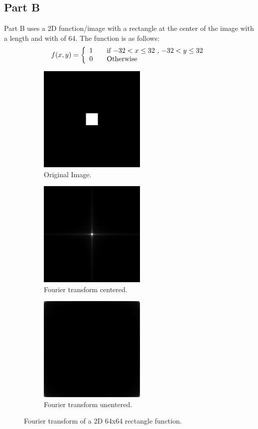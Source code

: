 \documentclass[letter]{article}
\begin{document}
\subsection{Part B}
Part B uses a 2D function/image with a rectangle at the center of the image with a length and with of 64. The function is as follows: $$f(x,y) = \left \{ \begin{array}{l l} 1 & \quad \text{if $-32 < x \leq 32$ , $-32 < y \leq 32$}\\ 0 & \quad \text{Otherwise}\end{array} \right.$$

\begin{figure}[hbtp]
  \centering
  \begin{subfigure}{5.1cm}
    \includegraphics[width=5.1cm]{images/rect_512_64x64.png}
    \caption{Original Image.}
  \end{subfigure}
  \begin{subfigure}{5.1cm}
    \includegraphics[width=5.1cm]{images/rect_512_64x64_FU_centered.png}
    \caption{Fourier transform centered.}
  \end{subfigure}
  \begin{subfigure}{5.1cm}
    \includegraphics[width=5.1cm]{images/rect_512_64x64_FU.png}
    \caption{Fourier transform unentered.}
  \end{subfigure}
  \caption{Fourier transform of a 2D 64x64 rectangle function.}
  \label{fig:ft_6464}
\end{figure}
\end{document}
